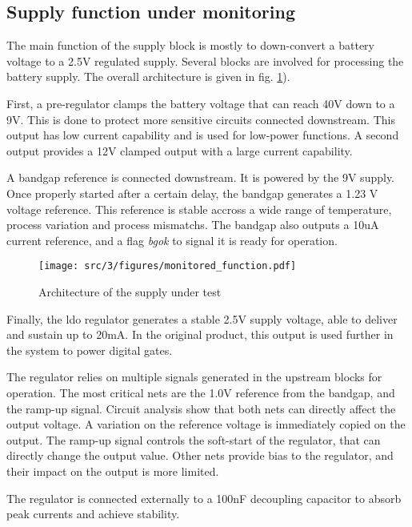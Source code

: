 \subsection{Supply function under monitoring}

The main function of the supply block is mostly to down-convert a battery voltage to a 2.5V regulated supply.
Several blocks are involved for processing the battery supply.
The overall architecture is given in fig. \ref{fig:monitored_function}).

First, a pre-regulator clamps the battery voltage that can reach 40V down to a 9V.
This is done to protect more sensitive circuits connected downstream.
This output has low current capability and is used for low-power functions.
A second output provides a 12V clamped output with a large current capability.

A bandgap reference is connected downstream.
It is powered by the 9V supply.
Once properly started after a certain delay, the bandgap generates a 1.23 V voltage reference.
This reference is stable accross a wide range of temperature, process variation and process mismatchs.
The bandgap also outputs a 10uA current reference, and a flag \textit{bgok} to signal it is ready for operation.

\begin{figure}[!htbp]
  \centering
  \texttt{[image: src/3/figures/monitored\_function.pdf]}
  \caption{Architecture of the supply under test}
  \label{fig:monitored_function}
\end{figure}

Finally, the \gls{ldo} regulator generates a stable 2.5V supply voltage, able to deliver and sustain up to 20mA.
In the original product, this output is used further in the system to power digital gates.

The regulator relies on multiple signals generated in the upstream blocks for operation.
The most critical nets are the 1.0V reference from the bandgap, and the ramp-up signal.
Circuit analysis show that both nets can directly affect the output voltage.
A variation on the reference voltage is immediately copied on the output.
The ramp-up signal controls the soft-start of the regulator, that can directly change the output value.
Other nets provide bias to the regulator, and their impact on the output is more limited.

The regulator is connected externally to a 100nF decoupling capacitor to absorb peak currents and achieve stability.


